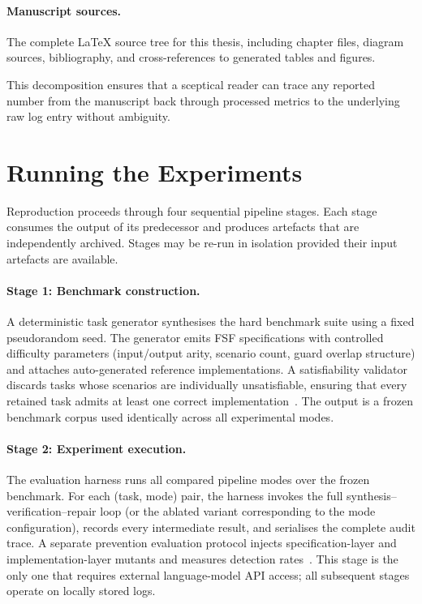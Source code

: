 \paragraph{Manuscript sources.}
The complete \LaTeX{} source tree for this thesis, including chapter
files, diagram sources, bibliography, and cross-references to
generated tables and figures.

This decomposition ensures that a sceptical reader can trace any reported
number from the manuscript back through processed metrics to the underlying
raw log entry without ambiguity.

\section{Running the Experiments}
\label{sec:repro:running}

Reproduction proceeds through four sequential pipeline stages.  Each stage consumes
the output of its predecessor and produces artefacts that are independently
archived.  Stages may be re-run in isolation provided their input artefacts
are available.

\paragraph{Stage 1: Benchmark construction.}
A deterministic task generator synthesises the hard benchmark suite
using a fixed pseudorandom seed.  The generator emits FSF
specifications with controlled difficulty parameters (input/output
arity, scenario count, guard overlap structure) and attaches
auto-generated reference implementations.  A satisfiability validator
discards tasks whose scenarios are individually unsatisfiable,
ensuring that every retained task admits at least one correct
implementation~\citep{demoura2008z3,barrett2018smt}.  The output is a frozen benchmark corpus used
identically across all experimental modes.

\paragraph{Stage 2: Experiment execution.}
The evaluation harness runs all compared pipeline modes over the
frozen benchmark.  For each (task, mode) pair, the harness invokes
the full synthesis--verification--repair loop (or the ablated variant
corresponding to the mode configuration), records every intermediate
result, and serialises the complete audit trace.  A separate prevention
evaluation protocol injects specification-layer and
implementation-layer mutants and measures detection rates~\citep{demillo1978mutation,li2023iet}.  This stage
is the only one that requires external language-model API access;
all subsequent stages operate on locally stored logs.

